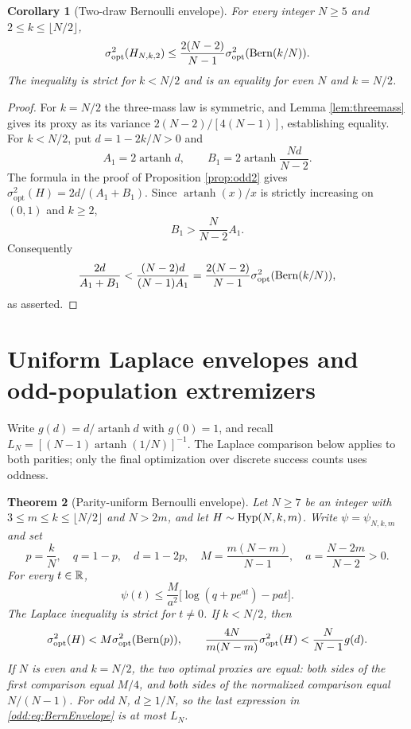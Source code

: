 \documentclass[11pt,a4paper]{article}
\newtheorem{theorem}{Theorem}[section]
\newtheorem{corollary}[theorem]{Corollary}
\begin{document}
\begin{corollary}[Two-draw Bernoulli envelope]\label{cor:two_bern_envelope}
For every integer $N\ge5$ and $2\le k\le\lfloor N/2\rfloor$,
\[
 \sigma^2_{\mathrm{opt}}(H_{N,k,2})
 \le\frac{2(N-2)}{N-1}\sigma^2_{\mathrm{opt}}(\operatorname{Bern}(k/N)).
\]
The inequality is strict for $k<N/2$ and is an equality for even $N$ and $k=N/2$.
\end{corollary}
\begin{proof}
For $k=N/2$ the three-mass law is symmetric, and Lemma \ref{lem:threemass} gives its proxy as its variance $2(N-2)/[4(N-1)]$, establishing equality. For $k<N/2$, put $d=1-2k/N>0$ and
\[
 A_1=2\operatorname{artanh}d,\qquad
 B_1=2\operatorname{artanh}\frac{Nd}{N-2}.
\]
The formula in the proof of Proposition \ref{prop:odd2} gives
$\sigma^2_{\mathrm{opt}}(H)=2d/(A_1+B_1)$. Since $\operatorname{artanh}(x)/x$ is strictly increasing on $(0,1)$ and $k\ge2$,
\[
 B_1>\frac{N}{N-2}A_1.
\]
Consequently
\[
 \frac{2d}{A_1+B_1}<\frac{(N-2)d}{(N-1)A_1}
 =\frac{2(N-2)}{N-1}\sigma^2_{\mathrm{opt}}(\operatorname{Bern}(k/N)),
\]
as asserted.
\end{proof}



\section{Uniform Laplace envelopes and odd-population extremizers}\label{sec:odd_uniform}
Write $g(d)=d/\operatorname{artanh}d$ with $g(0)=1$, and recall $L_N=[(N-1)\operatorname{artanh}(1/N)]^{-1}$. The Laplace comparison below applies to both parities; only the final optimization over discrete success counts uses oddness.

\begin{theorem}[Parity-uniform Bernoulli envelope]\label{odd:thm:envelope}
Let $N\ge7$ be an integer with $3\le m\le k\le\lfloor N/2\rfloor$ and $N>2m$, and let $H\sim\operatorname{Hyp}(N,k,m)$. Write $\psi=\psi_{N,k,m}$ and set
\[
 p=\frac{k}{N},\quad q=1-p,\quad d=1-2p,\quad
 M=\frac{m(N-m)}{N-1},\quad a=\frac{N-2m}{N-2}>0.
\]
For every $t\in\mathbb R$,
\begin{equation}\label{odd:eq:laplace}
 \boxed{\quad
 \psi(t)\le\frac{M}{a^2}\bigl[\log(q+pe^{at})-pat\bigr].\quad}
\end{equation}
The Laplace inequality is strict for $t\ne0$. If $k<N/2$, then
\begin{equation}\label{odd:eq:BernEnvelope}
 \sigma^2_{\rm opt}(H)<M\sigma^2_{\rm opt}(\operatorname{Bern}(p)),\qquad
 \frac{4N}{m(N-m)}\sigma^2_{\rm opt}(H)
 <\frac{N}{N-1}g(d).
\end{equation}
If $N$ is even and $k=N/2$, the two optimal proxies are equal: both sides of the first comparison equal $M/4$, and both sides of the normalized comparison equal $N/(N-1)$. For odd $N$, $d\ge 1/N$, so the last expression in \eqref{odd:eq:BernEnvelope} is at most $L_N$.

\end{theorem}
\end{document}

